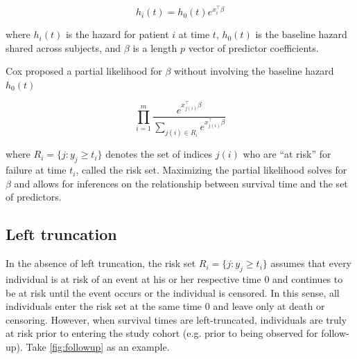 \documentclass[11pt,final,fleqn]{article}\usepackage[]{graphicx}\usepackage[]{color}
\theoremstyle{plain}
\begin{document}
\begin{equation}
h_i(t) = h_0(t)e^{x_i^\intercal\beta}
\end{equation}

where $h_i(t)$ is the hazard for patient $i$ at time $t$, $h_0(t)$ is the baseline hazard shared across subjects, and $\beta$ is a length $p$ vector of predictor coefficients.  

Cox\cite{cox1972regression} proposed a partial likelihood for $\beta$ without involving the baseline hazard $h_0(t)$

\begin{equation} \label{eqn:cox1972}
\prod_{i=1}^{m} \frac{e^{x_{j(i)}^\intercal\beta}}{\sum_{j(i)\in R_i}  e^{x_{j(i)}^\intercal\beta}   } 
\end{equation}

where  $R_i = \{ j : y_j \geq t_i\}$ denotes the set of indices $j(i)$ who are ``at risk'' for failure at time $t_i$, called the risk set. Maximizing the partial likelihood solves for $\beta$ and allows for inferences on the relationship between survival time and the set of predictors. 

\subsection{Left truncation}
In the absence of left truncation, the risk set $R_i = \{ j : y_j \geq t_i \}$ assumes that every individual is at risk of an event at his or her respective time 0 and continues to be at risk until the event occurs or the individual is censored. In this sense, all individuals enter the risk set at the same time 0 and leave only at death or censoring. However, when survival times are left-truncated, individuals are truly at risk prior to entering the study cohort (e.g. prior to being observed for follow-up). Take \autoref{fig:followup} as an example.
\end{document}

